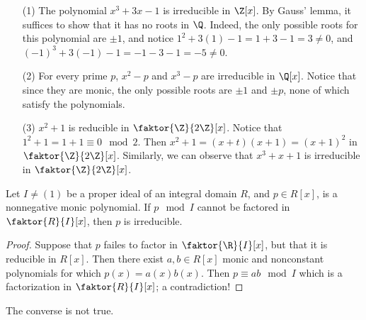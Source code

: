 \begin{example}\label{example_3.4}
    \begin{enumerate}
        \item[(1)] The polynomial $x^3+3x-1$ is irreducible in  $\Z[x]$. By
            Gauss' lemma, it suffices to show that it has no roots in $\Q$.
            Indeed, the only possible roots for this polynomial are  $\pm{1}$,
            and notice $1^2+3(1)-1=1+3-1=3 \neq 0$, and
            $(-1)^3+3(-1)-1=-1-3-1=-5 \neq 0$.

        \item[(2)] For every prime $p$,  $x^2-p$ and  $x^3-p$ are irreducible in
             $\Q[x]$. Notice that since they are monic, the only possible roots
             are $\pm{1}$ and $\pm{p}$, none of which satisfy the polynomials.

         \item[(3)] $x^2+1$ is reducible in  $\faktor{\Z}{2\Z}[x]$. Notice that
             $1^2+1=1+1 \equiv 0 \mod{2}$. Then $x^2+1=(x+t)(x+1)=(x+1)^2$ in
             $\faktor{\Z}{2\Z}[x]$. Similarly, we can observe that $x^3+x+1$ is
             irreducible in  $\faktor{\Z}{2\Z}[x]$.
    \end{enumerate}
\end{example}

\begin{lemma}\label{3.3.4}
    Let $I \neq (1)$ be a proper ideal of an integral domain $R$, and  $p \in
    R[x]$, is a nonnegative monic polynomial. If $p \mod{I}$ cannot be factored
    in $\faktor{R}{I}[x]$, then $p$ is irreducible.
\end{lemma}
\begin{proof}
    Suppose that $p$ failes to factor in  $\faktor{\R}{I}[x]$, but that it is
    reducible in $R[x]$. Then there exist $a,b \in R[x]$ monic and nonconstant
    polynomials for which $p(x)=a(x)b(x)$. Then $p \equiv ab \mod{I}$ which is a
    factorization in $\faktor{R}{I}[x]$; a contradiction!
\end{proof}
\begin{remark}
    The converse is not true.
\end{remark}

